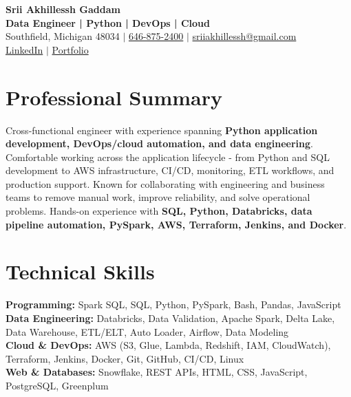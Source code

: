 \documentclass[letterpaper,10pt]{article}
\begin{document}
\fontsize{9.35pt}{10.45pt}\selectfont

\begin{center}
    {\LARGE \textbf{Srii Akhillessh Gaddam}} \\[-1pt]
    \textbf{Data Engineer | Python | DevOps | Cloud} \\[2pt]
    Southfield, Michigan 48034 $|$
    \href{tel:6468752400}{646-875-2400} $|$
    \href{mailto:sriiakhillessh@gmail.com}{sriiakhillessh@gmail.com} \\[1pt]
    \href{https://www.linkedin.com/in/srii-akhiilessh-gaddam-b48668191/}{LinkedIn} $|$
    \href{https://sriiakhillesshg.github.io/portfolio/}{Portfolio}
\end{center}
\vspace{-8pt}

\section{Professional Summary}
\small{Cross-functional engineer with experience spanning \textbf{Python application development, DevOps/cloud automation, and data engineering}. Comfortable working across the application lifecycle - from Python and SQL development to AWS infrastructure, CI/CD, monitoring, ETL workflows, and production support. Known for collaborating with engineering and business teams to remove manual work, improve reliability, and solve operational problems. Hands-on experience with \textbf{SQL, Python, Databricks, data pipeline automation, PySpark, AWS, Terraform, Jenkins, and Docker}.}

\section{Technical Skills}
\small{
\textbf{Programming:} Spark SQL, SQL, Python, PySpark, Bash, Pandas, JavaScript \\
\textbf{Data Engineering:} Databricks, Data Validation, Apache Spark, Delta Lake, Data Warehouse, ETL/ELT, Auto Loader, Airflow, Data Modeling \\
\textbf{Cloud \& DevOps:} AWS (S3, Glue, Lambda, Redshift, IAM, CloudWatch), Terraform, Jenkins, Docker, Git, GitHub, CI/CD, Linux \\
\textbf{Web \& Databases:} Snowflake, REST APIs, HTML, CSS, JavaScript, PostgreSQL, Greenplum
}
\end{document}
